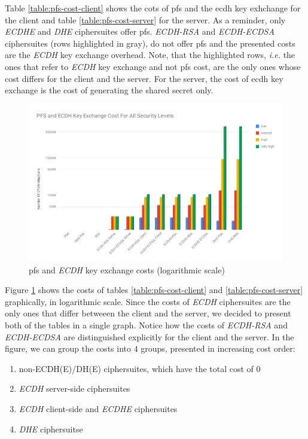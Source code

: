 \documentclass{llncs}
\begin{document}
Table \ref{table:pfs-cost-client} shows the cots of \gls{pfs} and the \gls{ecdh} key exhchange for the client and table \ref{table:pfs-cost-server}
for the server. As a reminder, only \textit{ECDHE} and \textit{DHE} ciphersuites offer \gls{pfs}. \textit{ECDH-RSA} and \textit{ECDH-ECDSA}
ciphersuites (rows highlighted in gray), do not offer \gls{pfs} and the presented costs are the \textit{ECDH} key exchange overhead. Note, that the
highlighted rows, \textit{i.e.} the ones that refer to \textit{ECDH} key exchange and not \gls{pfs} cost, are the only ones whose cost differs for
the client and the server. For the server, the cost of \gls{ecdh} key exchange is the cost of generating the shared secret only.

\begin{figure}
  \centering
  \includegraphics[width=1.0\textwidth]{img/pfs_cost_all_sls.png}
  \centering \caption{\label{fig:pfs-cost-all-sls} \gls{pfs} and \textit{ECDH} key exchange costs (logarithmic scale)}
\end{figure}

Figure \ref{fig:pfs-cost-all-sls} shows the costs of tables \ref{table:pfs-cost-client} and \ref{table:pfs-cost-server} graphically, in logarithmic scale.
 Since the costs 
of \textit{ECDH} ciphersuites are the only ones that differ betweeen the client and the server, we decided to present both of the tables in a
single graph. Notice how the costs of \textit{ECDH-RSA} and \textit{ECDH-ECDSA} are distinguished explicitly for the client and the server.
In the figure, we can group the costs into $4$ groups, presented in increasing cost order:

\begin{enumerate}
  \item non-ECDH(E)/DH(E) ciphersuites, which have the total cost of $0$
  \item \textit{ECDH} server-side ciphersuites
  \item \textit{ECDH} client-side and \textit{ECDHE} ciphersuites
  \item \textit{DHE} ciphersuitse
\end{enumerate}
\end{document}
